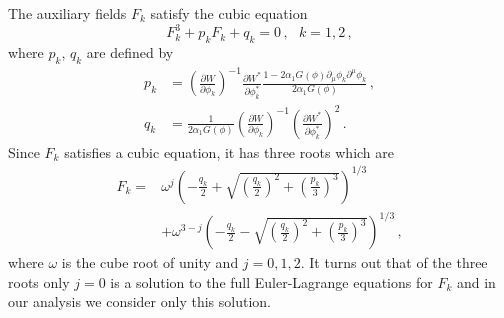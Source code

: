 \documentclass[12pt]{article}
\begin{document}
The auxiliary fields $F_k$ satisfy the cubic equation
\begin{equation}
  F_k^3 + p_k F_k + q_k = 0\,,
  ~~~ k = 1, 2\,,
\end{equation}
where $p_k$, $q_k$ are defined by
\begin{equation} \label{eq:DBI:pq}
  \begin{aligned}
    p_k &=
      \left(\frac{\partial W}{\partial \phi_k}\right)^{-1}
      \frac{\partial W^*}{\partial \phi^*_k}
      \frac
        {1 - 2 \alpha_1 G\left(\phi\right) \partial_\mu \phi_k \partial^\mu \phi_k}
        {2 \alpha_1 G\left(\phi\right)}\,,\\
    q_k &=
      \frac{1}{2 \alpha_1 G\left(\phi\right)}
      \left(\frac{\partial W}{\partial \phi_k}\right)^{-1}
      \left(\frac{\partial W^*}{\partial \phi^*_k}\right)^2\,.
  \end{aligned}
\end{equation}
Since $F_k$ satisfies a cubic equation, it has three roots which are
\begin{equation} \label{eq:DBI:F}
  \begin{aligned}
    F_k = &\omega^j \left(
      - \frac{q_k}{2}
      + \sqrt{\left(\frac{q_k}{2}\right)^2 + \left(\frac{p_k}{3}\right)^3}\right)^{1 / 3}\\
    & + \omega^{3 - j} \left(
      - \frac{q_k}{2}
      - \sqrt{\left(\frac{q_k}{2}\right)^2 + \left(\frac{p_k}{3}\right)^3}\right)^{1 / 3}\,,
  \end{aligned}
\end{equation}
where $\omega$ is the cube root of unity and $j = 0, 1, 2$.
It turns out that of the three roots only $j = 0$ is a solution to the full Euler-Lagrange equations for $F_k$ and in our analysis we consider only this solution.
\end{document}
